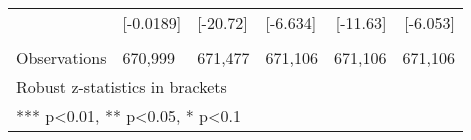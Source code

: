 \documentclass[a4paper]{article}
\begin{document}
\begin{table}[htbp]
\begin{tabular}{p{9.7em}lllrr}
          & \multicolumn{1}{p{5.3em}}{[-0.0189]} & \multicolumn{1}{p{5.3em}}{[-20.72]} & \multicolumn{1}{p{5.3em}}{[-6.634]} & \multicolumn{1}{p{5.3em}}{[-11.63]} & \multicolumn{1}{p{5.3em}}{[-6.053]} \\
          & \multicolumn{1}{p{5.3em}}{} & \multicolumn{1}{p{5.3em}}{} & \multicolumn{1}{p{5.3em}}{} & \multicolumn{1}{p{5.3em}}{} & \multicolumn{1}{p{5.3em}}{} \\
    Observations & \multicolumn{1}{p{5.3em}}{670,999} & \multicolumn{1}{p{5.3em}}{671,477} & \multicolumn{1}{p{5.3em}}{671,106} & \multicolumn{1}{p{5.3em}}{671,106} & \multicolumn{1}{p{5.3em}}{671,106} \\
    \midrule
    \multicolumn{4}{p{25.6em}}{Robust z-statistics in brackets} &       &  \\
    \multicolumn{4}{p{25.6em}}{*** p<0.01, ** p<0.05, * p<0.1} &       &  \\
    \end{tabular}%
  \label{tab:addlabel}%
\end{table}%
\end{document}
